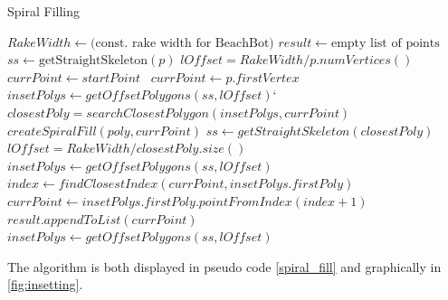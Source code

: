 \begin{algorithm}[H]
\begin{algorithmic}
\caption{Spiral Filling}\label{spiral_fill}

\State $RakeWidth \gets \text{(const. rake width for BeachBot)}$
\State $result \gets \text{empty list of points}$
\State $ss \gets \text{getStraightSkeleton}(p)$
\State $lOffset = RakeWidth/p.numVertices()$
 $currPoint \gets startPoint$ 
\Else ~$ currPoint \gets p.firstVertex$ 
\EndIf
\State $insetPolys \gets getOffsetPolygons(ss, lOffset)$`
	\State $closestPoly = searchClosestPolygon(insetPolys, currPoint)$
		\State $createSpiralFill(poly, currPoint)$
	\EndFor
	\State $ss \gets getStraightSkeleton(closestPoly)$
	\State $lOffset = RakeWidth/closestPoly.size()$
	\State $insetPolys \gets getOffsetPolygons(ss, lOffset)$
\EndIf
\State $index \gets findClosestIndex(currPoint, insetPolys.firstPoly)$
\State $currPoint \gets insetPolys.firstPoly.pointFromIndex(index + 1)$
\State $result.appendToList(currPoint)$
\State $insetPolys \gets getOffsetPolygons(ss, lOffset)$
\EndWhile
\EndFunction

\end{algorithmic}

\end{algorithm}

The algorithm is both displayed in pseudo code \autoref{spiral_fill} and graphically in  \autoref{fig:insetting}. 

